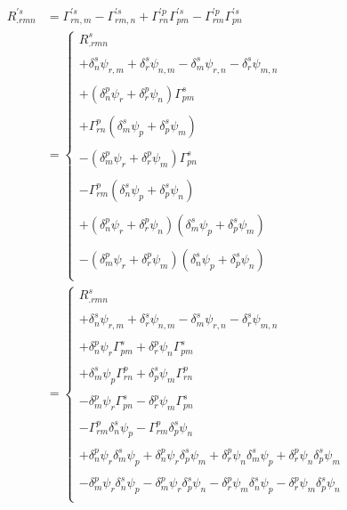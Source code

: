 \begin{align}
R^{'s}_{.rmn} &= \Gamma^{'s}_{rn,m} - \Gamma^{'s}_{rm,n}+\Gamma^{'p}_{rn}\Gamma^{'s}_{pm}-\Gamma^{'p}_{rm}\Gamma^{'s}_{pn}\\
&=\left\{\begin{matrix}
R^{s}_{.rmn}\\\\
+\delta^s_n\psi_{r,m} +\delta^s_r\psi_{n,m}-\delta^s_m\psi_{r,n} -\delta^s_r\psi_{m,n}\\\\
+\left(\delta^p_n\psi_r +\delta^p_r\psi_n\right) \Gamma^{s}_{pm}\\\\
+\Gamma^{p}_{rn}\left(\delta^s_m\psi_p +\delta^s_p\psi_m\right)\\\\
-\left(\delta^p_m\psi_r +\delta^p_r\psi_m\right)\Gamma^{s}_{pn}\\\\
-\Gamma^{p}_{rm}\left(\delta^s_n\psi_p +\delta^s_p\psi_n\right)\\\\
+\left(\delta^p_n\psi_r +\delta^p_r\psi_n\right) \left(\delta^s_m\psi_p +\delta^s_p\psi_m\right)\\\\
-\left(\delta^p_m\psi_r +\delta^p_r\psi_m\right)\left(\delta^s_n\psi_p +\delta^s_p\psi_n\right)\\
\end{matrix}\right.\\
&=\left\{\begin{matrix}
R^{s}_{.rmn}\\\\
+\delta^s_n\psi_{r,m} +\delta^s_r\psi_{n,m}-\delta^s_m\psi_{r,n} -\delta^s_r\psi_{m,n}\\\\
+\delta^p_n\psi_r\Gamma^{s}_{pm} +\delta^p_r\psi_n \Gamma^{s}_{pm}\\\\
+\delta^s_m\psi_p\Gamma^{p}_{rn} +\delta^s_p\psi_m\Gamma^{p}_{rn}\\\\
-\delta^p_m\psi_r\Gamma^{s}_{pn} -\delta^p_r\psi_m\Gamma^{s}_{pn}\\\\
-\Gamma^{p}_{rm}\delta^s_n\psi_p -\Gamma^{p}_{rm}\delta^s_p\psi_n\\\\
+\delta^p_n\psi_r\delta^s_m\psi_p +\delta^p_n\psi_r\delta^s_p\psi_m +\delta^p_r\psi_n\delta^s_m\psi_p  +\delta^p_r\psi_n \delta^s_p\psi_m\\\\
-\delta^p_m\psi_r \delta^s_n\psi_p -\delta^p_m\psi_r \delta^s_p\psi_n-\delta^p_r\psi_m\delta^s_n\psi_p -\delta^p_r\psi_m\delta^s_p\psi_n\\
\end{matrix}\right.
\end{align}
